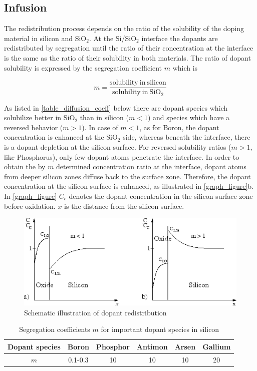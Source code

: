 \subsection{Infusion}
The redistribution process depends on the ratio of the solubility of the doping material in silicon and SiO$ _2$. At the Si/SiO$ _2$ interface the dopants are redistributed by segregation until the ratio of their concentration at the interface is the same as the ratio of their solubility in both materials. The ratio of dopant solubility is expressed by the segregation coefficient $m$ which is

\begin{equation}
\displaystyle m = \frac{
	\mathrm{solubility\ in\ silicon}
	}{
	\mathrm{solubility\ in\ SiO_2}
	}
\end{equation}

As listed in \autoref{table_diffusion_coeff} below there are dopant species which solubilize better in SiO$ _2$ than in silicon ($ m < 1$) and species which have a reversed behavior ($ m > 1$).
In case of $ m < 1$, as for Boron, the dopant concentration is enhanced at the SiO$ _2$ side, whereas beneath the interface, there is a dopant depletion at the silicon surface.
For reversed solubility ratios ($ m > 1$, like Phosphorus), only few dopant atoms penetrate the interface.
In order to obtain the by $ m$ determined concentration ratio at the interface, dopant atoms from deeper silicon zones diffuse back to the surface zone.
Therefore, the dopant concentration at the silicon surface is enhanced, as illustrated in \autoref{graph_figure}b.
In \autoref{graph_figure} $ C_c$ denotes the dopant concentration in the silicon surface zone before oxidation. $ x$ is the distance from the silicon surface.

\begin{figure}[H]
	\centering
	\includegraphics[width=0.75\linewidth]{infusion_penetration.png}
	\caption{Schematic illustration of dopant redistribution}
	\label{graph_figure}
\end{figure}
\begin{table}[H]
	\centering
	\begin{tabular}{|c|c|c|c|c|c|}
		\hline
		Dopant species &
		Boron &
		Phosphor &
		Antimon &
		Arsen &
		Gallium \\
		\hline
		$m$ &
		0.1-0.3 &
		10 &
		10 &
		10 &
		20 \\
		\hline
	\end{tabular}
	\caption{Segregation coefficients $m$ for important dopant species in silicon}
	\label{table_diffusion_coeff}
\end{table}